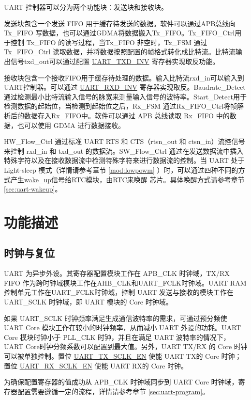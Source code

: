 \documentclass[main\_\_CN.tex]{subfiles}
\begin{document}
UART 控制器可以分为两个功能块：发送块和接收块。

发送块包含一个发送 FIFO 用于缓存待发送的数据。软件可以通过APB总线向 Tx\_FIFO 写数据，也可以通过GDMA将数据搬入Tx\_FIFO。Tx\_FIFO\_Ctrl用于控制 Tx\_FIFO 的读写过程，当Tx\_FIFO 非空时，Tx\_FSM 通过 Tx\_FIFO\_Ctrl 读取数据，并将数据按照配置的帧格式转化成比特流。比特流输出信号txd\_out可以通过配置 \hyperref[fielddesc:UARTTXDINV]{UART\_TXD\_INV} 寄存器实现取反功能。

接收块包含一个接收FIFO用于缓存待处理的数据。输入比特流rxd\_in可以输入到UART控制器。可以通过
\hyperref[fielddesc:UARTRXDINV]{UART\_RXD\_INV} 寄存器实现取反。Baudrate\_Detect通过检测最小比特流输入信号的脉宽来测量输入信号的波特率。Start\_Detect用于检测数据的起始位，当检测到起始位之后，Rx\_FSM 通过Rx\_FIFO\_Ctrl将帧解析后的数据存入Rx\_FIFO中。软件可以通过 APB 总线读取 Rx\_FIFO 中的数据，也可以使用 GDMA 进行数据接收。

HW\_Flow\_Ctrl 通过标准 UART RTS 和 CTS（rtsn\_out 和 ctsn\_in）流控信号来控制 rxd\_in 和 txd\_out 的数据流。SW\_Flow\_Ctrl 通过在发送数据流中插入特殊字符以及在接收数据流中检测特殊字符来进行数据流的控制。当 UART 处于 Light-sleep 模式（详情请参考章节 \ref{mod:lowpowm} \textit{}）时，可以通过四种不同的方式产生wake\_up信号给RTC模块，由RTC来唤醒 \chipname{} 芯片。具体唤醒方式请参考章节 \ref{sec:uart-wakeup}。

\section{功能描述}

\subsection{时钟与复位}
UART 为异步外设。其寄存器配置模块工作在 APB\_CLK 时钟域，TX/RX FIFO 作为跨时钟域模块工作在AHB\_CLK和UART\_FCLK时钟域。UART RAM控制单元工作在UART\_FCLK时钟域，控制 UART 发送与接收的模块工作在 UART\_SCLK 时钟域，即 UART 模块的 Core 时钟域。

如果 UART\_SCLK 时钟频率满足生成通信波特率的需求，可通过预分频使 UART Core 模块工作在较小的时钟频率，从而减小 UART 外设的功耗。UART Core 模块时钟小于 PLL\_CLK 时钟，并且在满足 UART 波特率的情况下，UART Core时钟分频系数可以配置到最大值。另外，UART TX/RX 的 Core 时钟可以被单独控制。置位 \hyperref[fielddesc:UARTTXSCLKEN]{UART\_TX\_SCLK\_EN} 使能 UART TX的 Core 时钟；置位 \hyperref[fielddesc:UARTRXSCLKEN]{UART\_RX\_SCLK\_EN} 使能 UART RX的 Core 时钟。

为确保配置寄存器的值成功从 APB\_CLK 时钟域同步到 UART Core 时钟域，寄存器配置需要遵循一定的流程，详情请参考章节 \ref{sec:uart-program}。
\end{document}

